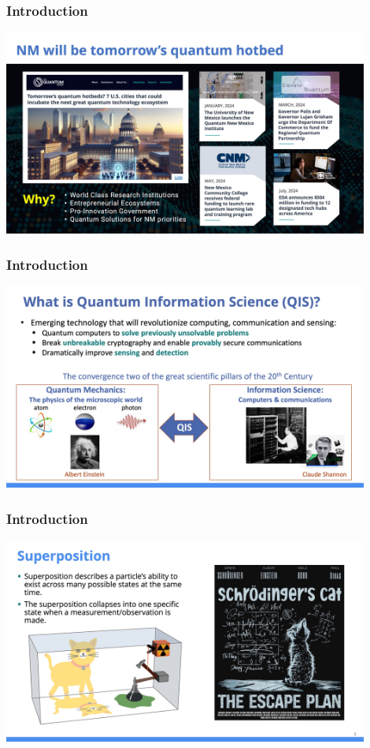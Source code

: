\documentclass{beamer}
\begin{document}
\begin{frame}\frametitle{Introduction}
\begin{center}
\includegraphics[width=12cm]{fig/Slide2.jpeg}
\end{center}
\end{frame}

\begin{frame}\frametitle{Introduction}
\begin{center}
\includegraphics[width=12cm]{fig/Slide4.jpeg}
\end{center}
\end{frame}

\begin{frame}\frametitle{Introduction}
\begin{center}
\includegraphics[width=12cm]{fig/supercat.jpg}
\end{center}
\end{frame}
\end{document}
